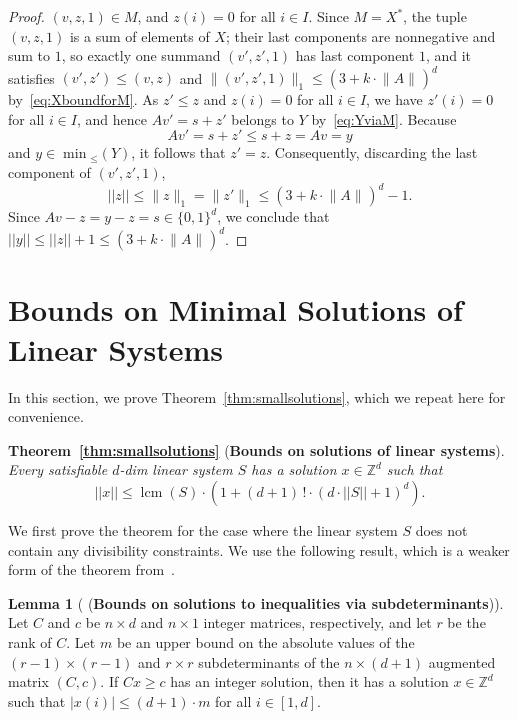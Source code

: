 \documentclass[11pt,a4paper]{amsart}
\newcommand{\nnorm}[1]{||#1||}
\newcommand{\Zset}{\mathbb{Z}}
\newcommand{\setZ}{\Zset}
\newcommand{\norm}[2]{\lVert #2 \rVert_{#1}}
\newcommand{\mlcm}[1]{\operatorname{lcm}(#1)}
\theoremstyle{plain}
\theoremstyle{definition}
\theoremstyle{defC}
\theoremstyle{thmC}
\newtheorem{lemC}[thm]{Lemma}
\begin{document}
\begin{proof}
	$(v,z,1)\in M$,
and $z(i)=0$ for all $i\in I$.
	Since $M=X^*$, the tuple $(v,z,1)$ is a sum of elements of $X$;
	their last components are nonnegative and sum to $1$, so exactly
	one summand $(v',z',1)$ has last component $1$, and it satisfies
	$(v',z')\leq (v,z)$ and
	$\norm{1}{(v',z',1)}\leq (3+k\cdot\norm{}{A})^d$
	by~\eqref{eq:XboundforM}.
	As $z'\leq z$ and $z(i)=0$ for all $i\in I$, we have $z'(i)=0$ for
	all $i\in I$, and hence $Av'=s+z'$ belongs to $Y$
	by~\eqref{eq:YviaM}.
	Because 
	\[Av'=s+z'\leq s+z=Av=y\] and $y\in \min{}_{\leq}(Y)$, it
	follows that $z'=z$. 
	Consequently, discarding the last component of $(v',z',1)$,
	\[\nnorm{z}\leq\norm{1}{z}=\norm{1}{z'}\leq (3+k\cdot\norm{}{A})^d-1.\]
	Since $Av-z=y-z=s\in\{0,1\}^d$,
	we conclude that $\nnorm{y}\leq\nnorm{z}+1\leq
	(3+k\cdot\norm{}{A})^d$.
\end{proof}

\section{Bounds on Minimal Solutions of Linear Systems}\label{sec:smallsolutions}


In this section, we prove Theorem~\ref{thm:smallsolutions}, which we
repeat here for convenience.

\medskip
\noindent
	\textbf{Theorem~\ref{thm:smallsolutions}} (\textbf{Bounds on solutions of linear
	systems}).
\hfill\\
	\emph{
Every satisfiable $d$-dim linear system $S$ 
 has a solution $x\in\setZ^d$ such that
	\[\nnorm{x}\leq
		\mlcm{S} \cdot \left(1+ (d+1)\,!\cdot (d\cdot
		\nnorm{S}+1)^{d}\right).\]
}
\medskip


We first prove the theorem for the case where the linear system $S$
	does not contain any divisibility constraints. We use the
	following result, which is a weaker form of the theorem from~\cite{Gathen1978}.

	\begin{lemC}[\cite{Gathen1978} (\textbf{Bounds on solutions to
		inequalities 
		via subdeterminants})]\label{lem:Gathen}
Let $C$ and $c$ be $n\times d$ and $n\times 1$ integer matrices, respectively,
and let $r$ be the rank of $C$. Let $m$ be an
	upper bound on the absolute values of the $(r-1)\times (r-1)$
	and $r\times r$ subdeterminants of the $n\times (d+1)$
	augmented matrix
	$(C, c)$. If $Cx\geq c$ has an integer solution, then it has
	a solution $x\in \setZ^d$ such that $|x(i)|\leq (d+1)\cdot m$ for
	all $i\in [1,d]$.
\end{lemC}
\end{document}
